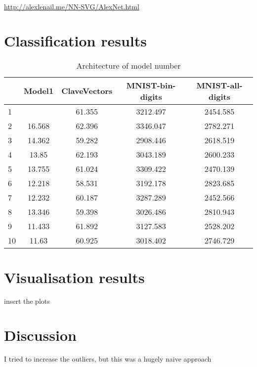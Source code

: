 \url{http://alexlenail.me/NN-SVG/AlexNet.html}

\section{Classification results}
\begin{table}[H]
	\centering
\begin{tabular}{|lcccc|}
	\hline
	\backslashbox{run \#}{Model}
&{Model1}&{ClaveVectors}&{MNIST-bin-digits}&{MNIST-all-digits} \\\hline\hline
	1 &  & 61.355 & 3212.497 & 2454.585 \\ \hline
	2 & 16.568 & 62.396 & 3346.047 & 2782.271 \\ \hline
	3 & 14.362 & 59.282 & 2908.446 & 2618.519 \\ \hline
	4 & 13.85 & 62.193 & 3043.189 &  2600.233 \\ \hline
	5 & 13.755 & 61.024 & 3309.422 & 2470.139 \\ \hline
	6 & 12.218 & 58.531 & 3192.178 & 2823.685 \\ \hline
	7 & 12.232 & 60.187 & 3287.289 & 2452.566 \\ \hline
	8 & 13.346 & 59.398 & 3026.486 & 2810.943 \\ \hline
	9 & 11.433 & 61.892 & 3127.583 & 2528.202 \\ \hline
	10 & 11.63 & 60.925 & 3018.402 & 2746.729 \\ \hline
\end{tabular}
	\caption{Architecture of model number}
\end{table}

\section{Visualisation results}
insert the plots

\section{Discussion}
I tried to increase the outliers, but this was a hugely naive approach


